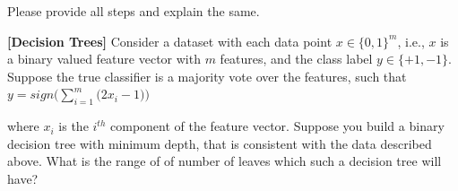 \documentclass[addpoints,12pt,solution]{exam}
\begin{document}
\begin{questions}

Please provide all steps and explain the same. 

\begin{solution}
\end{solution}







\question[2] \textbf{[Decision Trees]} Consider a dataset with each data point $x \in \{0, 1\}^m$, i.e., $x$ is a binary valued feature vector with $m$ features, and the class label $y \in \{+1, −1\}$. Suppose the true classifier is a majority vote over the features, such that\\
$y = sign \Big(\sum_{i=1}^{m}\big( 2x_i - 1\big)\Big)$

where $x_i$ is the $i^{th}$ component of the feature vector. Suppose you build a binary decision tree with minimum depth, that is consistent with the data described above. What is the range of of number of leaves which  such a decision tree will have?
\begin{solution}
\end{solution}




\end{questions}
\end{document}
